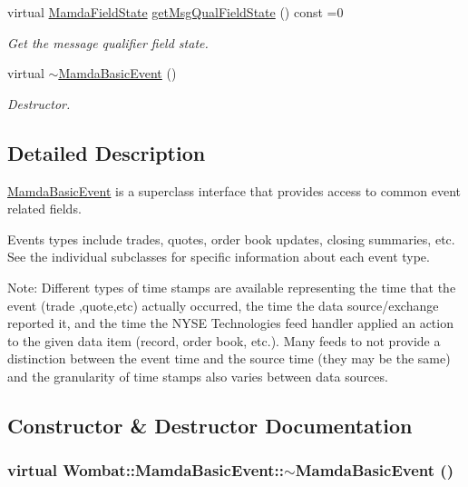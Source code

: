 \begin{CompactItemize}
virtual \hyperlink{namespaceWombat_93aac974f2ab713554fd12a1fa3b7d2a}{Mamda\-Field\-State} \hyperlink{classWombat_1_1MamdaBasicEvent_3454d51e1131d9949691ee4b4153cd97}{get\-Msg\-Qual\-Field\-State} () const =0
\begin{CompactList}\small\item\em Get the message qualifier field state. \item\end{CompactList}\item 
virtual \hyperlink{classWombat_1_1MamdaBasicEvent_ea6c050ea8aa8d85c09b065f4a69d71a}{$\sim$Mamda\-Basic\-Event} ()
\begin{CompactList}\small\item\em Destructor. \item\end{CompactList}\end{CompactItemize}


\subsection{Detailed Description}
\hyperlink{classWombat_1_1MamdaBasicEvent}{Mamda\-Basic\-Event} is a superclass interface that provides access to common event related fields. 

Events types include trades, quotes, order book updates, closing summaries, etc. See the individual subclasses for specific information about each event type.

Note: Different types of time stamps are available representing the time that the event (trade ,quote,etc) actually occurred, the time the data source/exchange reported it, and the time the NYSE Technologies feed handler applied an action to the given data item (record, order book, etc.). Many feeds to not provide a distinction between the event time and the source time (they may be the same) and the granularity of time stamps also varies between data sources. 



\subsection{Constructor \& Destructor Documentation}
\hypertarget{classWombat_1_1MamdaBasicEvent_ea6c050ea8aa8d85c09b065f4a69d71a}{
\subsubsection[$\sim$MamdaBasicEvent]{\setlength{\rightskip}{0pt plus 5cm}virtual Wombat::Mamda\-Basic\-Event::$\sim$Mamda\-Basic\-Event ()}}
\label{classWombat_1_1MamdaBasicEvent_ea6c050ea8aa8d85c09b065f4a69d71a}



